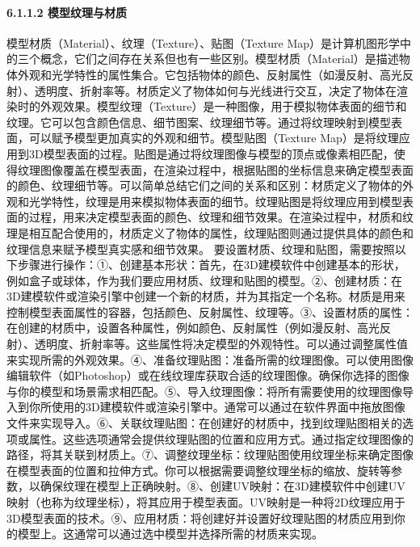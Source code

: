{{\paragraph{6.1.1.2 模型纹理与材质}\label{ux6a21ux578bux7eb9ux7406ux4e0eux6750ux8d28} 模型材质（Material）、纹理（Texture）、贴图（Texture
Map）是计算机图形学中的三个概念，它们之间存在关系但也有一些区别。模型材质（Material）是描述物体外观和光学特性的属性集合。它包括物体的颜色、反射属性（如漫反射、高光反射）、透明度、折射率等。材质定义了物体如何与光线进行交互，决定了物体在渲染时的外观效果。模型纹理（Texture）是一种图像，用于模拟物体表面的细节和纹理。它可以包含颜色信息、细节图案、纹理细节等。通过将纹理映射到模型表面，可以赋予模型更加真实的外观和细节。模型贴图（Texture
Map）是将纹理应用到3D模型表面的过程。贴图是通过将纹理图像与模型的顶点或像素相匹配，使得纹理图像覆盖在模型表面，在渲染过程中，根据贴图的坐标信息来确定模型表面的颜色、纹理细节等。可以简单总结它们之间的关系和区别：材质定义了物体的外观和光学特性，纹理是用来模拟物体表面的细节。纹理贴图是将纹理应用到模型表面的过程，用来决定模型表面的颜色、纹理和细节效果。在渲染过程中，材质和纹理是相互配合使用的，材质定义了物体的属性，纹理贴图则通过提供具体的颜色和纹理信息来赋予模型真实感和细节效果。
要设置材质、纹理和贴图，需要按照以下步骤进行操作：①、创建基本形状：首先，在3D建模软件中创建基本的形状，例如盒子或球体，作为我们要应用材质、纹理和贴图的模型。②、创建材质：在3D建模软件或渲染引擎中创建一个新的材质，并为其指定一个名称。材质是用来控制模型表面属性的容器，包括颜色、反射属性、纹理等。③、设置材质的属性：在创建的材质中，设置各种属性，例如颜色、反射属性（例如漫反射、高光反射）、透明度、折射率等。这些属性将决定模型的外观特性。可以通过调整属性值来实现所需的外观效果。④、准备纹理贴图：准备所需的纹理图像。可以使用图像编辑软件（如Photoshop）或在线纹理库获取合适的纹理图像。确保你选择的图像与你的模型和场景需求相匹配。⑤、导入纹理图像：将所有需要使用的纹理图像导入到你所使用的3D建模软件或渲染引擎中。通常可以通过在软件界面中拖放图像文件来实现导入。⑥、关联纹理贴图：在创建好的材质中，找到纹理贴图相关的选项或属性。这些选项通常会提供纹理贴图的位置和应用方式。通过指定纹理图像的路径，将其关联到材质上。⑦、调整纹理坐标：纹理贴图使用纹理坐标来确定图像在模型表面的位置和拉伸方式。你可以根据需要调整纹理坐标的缩放、旋转等参数，以确保纹理在模型上正确映射。⑧、创建UV映射：在3D建模软件中创建UV映射（也称为纹理坐标），将其应用于模型表面。UV映射是一种将2D纹理应用于3D模型表面的技术。⑨、应用材质：将创建好并设置好纹理贴图的材质应用到你的模型上。这通常可以通过选中模型并选择所需的材质来实现。
}}
